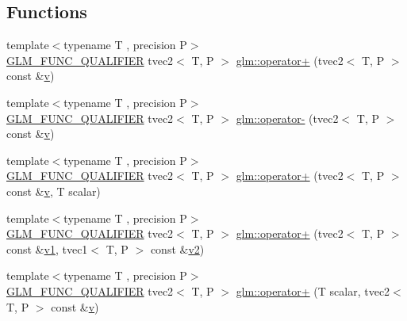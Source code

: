\subsection*{Functions}
\begin{DoxyCompactItemize}
\item 
{\footnotesize template$<$typename T , precision P$>$ }\\\mbox{\hyperlink{setup_8hpp_a33fdea6f91c5f834105f7415e2a64407}{G\+L\+M\+\_\+\+F\+U\+N\+C\+\_\+\+Q\+U\+A\+L\+I\+F\+I\+ER}} tvec2$<$ T, P $>$ \mbox{\hyperlink{namespaceglm_a9c5f536db37e98bc7fa734b41b7fb881}{glm\+::operator+}} (tvec2$<$ T, P $>$ const \&\mbox{\hyperlink{glad_8h_a14cfbe2fc2234f5504618905b69d1e06}{v}})
\item 
{\footnotesize template$<$typename T , precision P$>$ }\\\mbox{\hyperlink{setup_8hpp_a33fdea6f91c5f834105f7415e2a64407}{G\+L\+M\+\_\+\+F\+U\+N\+C\+\_\+\+Q\+U\+A\+L\+I\+F\+I\+ER}} tvec2$<$ T, P $>$ \mbox{\hyperlink{namespaceglm_aac7bcd6421bf7f0b2efe7dceeaccee48}{glm\+::operator-\/}} (tvec2$<$ T, P $>$ const \&\mbox{\hyperlink{glad_8h_a14cfbe2fc2234f5504618905b69d1e06}{v}})
\item 
{\footnotesize template$<$typename T , precision P$>$ }\\\mbox{\hyperlink{setup_8hpp_a33fdea6f91c5f834105f7415e2a64407}{G\+L\+M\+\_\+\+F\+U\+N\+C\+\_\+\+Q\+U\+A\+L\+I\+F\+I\+ER}} tvec2$<$ T, P $>$ \mbox{\hyperlink{namespaceglm_a7e901f3d08b50b2133f7c70ce6c84afe}{glm\+::operator+}} (tvec2$<$ T, P $>$ const \&\mbox{\hyperlink{glad_8h_a14cfbe2fc2234f5504618905b69d1e06}{v}}, T scalar)
\item 
{\footnotesize template$<$typename T , precision P$>$ }\\\mbox{\hyperlink{setup_8hpp_a33fdea6f91c5f834105f7415e2a64407}{G\+L\+M\+\_\+\+F\+U\+N\+C\+\_\+\+Q\+U\+A\+L\+I\+F\+I\+ER}} tvec2$<$ T, P $>$ \mbox{\hyperlink{namespaceglm_a1d23a7426b5cabfac18d5365f13c935a}{glm\+::operator+}} (tvec2$<$ T, P $>$ const \&\mbox{\hyperlink{glad_8h_a0779c3b73f9aa3a0ac5b0139b5d291d9}{v1}}, tvec1$<$ T, P $>$ const \&\mbox{\hyperlink{glad_8h_a9a09a1837922b2b806f4589096a52049}{v2}})
\item 
{\footnotesize template$<$typename T , precision P$>$ }\\\mbox{\hyperlink{setup_8hpp_a33fdea6f91c5f834105f7415e2a64407}{G\+L\+M\+\_\+\+F\+U\+N\+C\+\_\+\+Q\+U\+A\+L\+I\+F\+I\+ER}} tvec2$<$ T, P $>$ \mbox{\hyperlink{namespaceglm_aa9fcefc7747dc4383929403e48f01196}{glm\+::operator+}} (T scalar, tvec2$<$ T, P $>$ const \&\mbox{\hyperlink{glad_8h_a14cfbe2fc2234f5504618905b69d1e06}{v}})

\end{DoxyCompactItemize}
